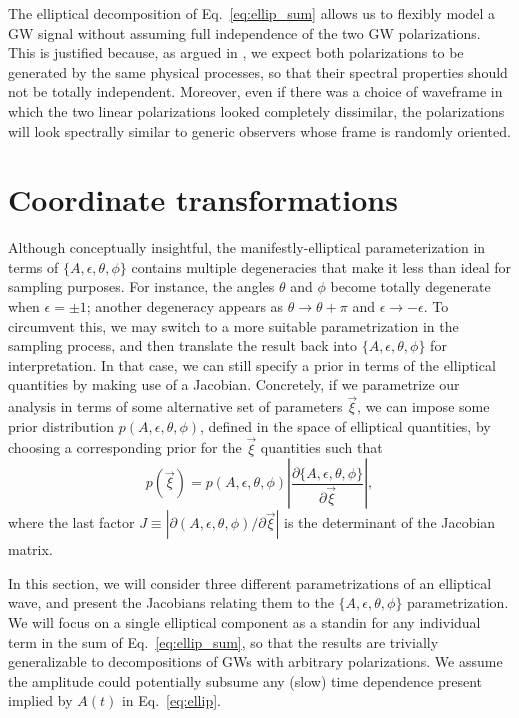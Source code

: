 \documentclass[aps,prd,twocolumn,superscriptaddress,preprintnumbers,floatfix,nofootinbib]{revtex4-2}
\begin{document}
The elliptical decomposition of Eq.~\eqref{eq:ellip_sum} allows us to flexibly model a GW signal without assuming full independence of the two GW polarizations.
This is justified because, as argued in \cite{Chatziioannou:2021mij}, we expect both polarizations to be generated by the same physical processes, so that their spectral properties should not be totally independent.
Moreover, even if there was a choice of waveframe in which the two linear polarizations looked completely dissimilar, the polarizations will look spectrally similar to generic observers whose frame is randomly oriented.


\section{Coordinate transformations}

Although conceptually insightful, the manifestly-elliptical parameterization in terms of $\{A, \epsilon, \theta, \phi\}$ contains multiple degeneracies that make it less than ideal for sampling purposes.
For instance, the angles $\theta$ and $\phi$ become totally degenerate when $\epsilon = \pm 1$; another degeneracy appears as $\theta \to \theta + \pi$ and $\epsilon \to - \epsilon$.
To circumvent this, we may switch to a more suitable parametrization in the sampling process, and then translate the result back into $\{A, \epsilon, \theta, \phi\}$ for interpretation.
In that case, we can still specify a prior in terms of the elliptical quantities by making use of a Jacobian.
Concretely, if we parametrize our analysis in terms of some alternative set of parameters $\vec{\xi}$, we can impose some prior distribution $p({A, \epsilon, \theta, \phi})$, defined in the space of elliptical quantities, by choosing a corresponding prior for the $\vec{\xi}$ quantities such that
\begin{equation}
p \left( \vec{\xi} \right) = p \left( A, \epsilon, \theta, \phi \right) \left| \frac{\partial \{A, \epsilon, \theta, \phi\}}{\partial \vec{\xi}} \right| ,
\end{equation}
where the last factor $J \equiv | \partial (A, \epsilon, \theta, \phi)/\partial \vec{\xi} |$ is the determinant of the Jacobian matrix.


In this section, we will consider three different parametrizations of an elliptical wave, and present the Jacobians relating them to the $\{A, \epsilon, \theta, \phi\}$ parametrization.
We will focus on a single elliptical component as a standin for any individual term in the sum of Eq.~\eqref{eq:ellip_sum}, so that the results are trivially generalizable to decompositions of GWs with arbitrary polarizations.
We assume the amplitude could potentially subsume any (slow) time dependence present implied by $A(t)$ in Eq.~\eqref{eq:ellip}.
\end{document}
